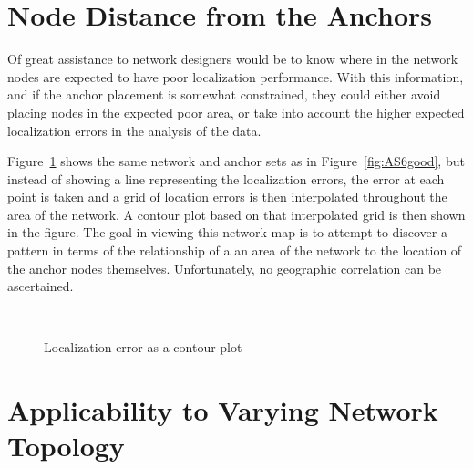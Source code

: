 \section{Node Distance from the Anchors}

Of great assistance to network designers would be to know where in the network nodes are expected to have poor localization performance.  With this information, and if the anchor placement is somewhat constrained, they could either avoid placing nodes in the expected poor area, or take into account the higher expected localization errors in the analysis of the data.

Figure~\ref{fig:AS6goodcontour} shows the same network and anchor sets as in Figure~\ref{fig:AS6good}, but instead of showing a line representing the localization errors, the error at each point is taken and a grid of location errors is then interpolated throughout the area of the network.  A contour plot based on that interpolated grid is then shown in the figure.  The goal in viewing this network map is to attempt to discover a pattern in terms of the relationship of a an area of the network to the location of the anchor nodes themselves.  Unfortunately, no geographic correlation can be ascertained.

\begin{figure}
  \centering
	\\
	\caption{Localization error as a contour plot}
	\label{fig:AS6goodcontour}
\end{figure}


\section{Applicability to Varying Network Topology}

